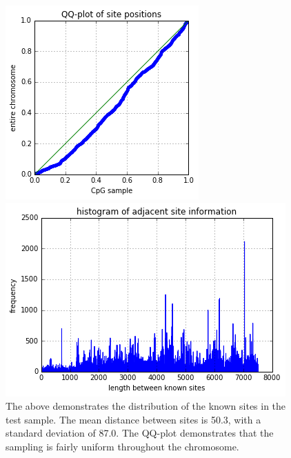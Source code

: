 \documentclass{article} %
\begin{document}
\begin{figure}[H]
    \centering
    
    \begin{minipage}[b]{0.3\textwidth}
        \includegraphics[width=\textwidth]{qqtest.png}
    \end{minipage}
    \hspace{0.15\textwidth}
    \begin{minipage}[b]{0.4\textwidth}
        \includegraphics[width=\textwidth]{adjhist.png}
    \end{minipage}
    
    \label{fig:sampleknowndistrib}
    \caption{The above demonstrates the distribution of the known sites in the test sample. The mean distance between sites is 50.3, with a standard deviation of 87.0. The QQ-plot demonstrates that the sampling is fairly uniform throughout the chromosome.}
\end{figure}
\end{document}

